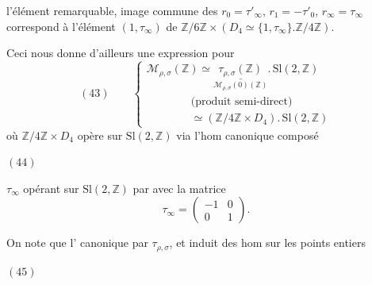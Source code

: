 
l'élément remarquable, image commune des $r_0=\tau'_\infty$, $r_1=-\tau'_0$, $r_\infty=\tau_\infty$ correspond à l'élément $(1,\tau_\infty)$ de $\mathbb Z/6\mathbb Z\times(D_4\simeq\{1,\tau_\infty\}.\mathbb Z/4\mathbb Z)$.

Ceci nous donne d'ailleurs une expression pour 
\[
(43)\qquad
\left\{
\begin{array}{l}
\mathcal M_{\rho,\sigma}(\mathbb Z)\simeq
\underset{\mathcal M_{\rho,\sigma}(0)(\mathbb Z)}{\underline{\tau_{\rho,\sigma}(\mathbb Z)}}
.\,\mathrm{Sl}(2,\mathbb Z)\\[5pt]
\hspace{4em}\text{(produit semi-direct)}\\[5pt]
\hspace{4em}\simeq(\mathbb Z/4\mathbb Z\times D_4).\,\mathrm{Sl}(2,\mathbb Z)
\end{array}\right.
\]
où $\mathbb Z/4\mathbb Z\times D_4$ opère sur $\mathrm{Sl}(2,\mathbb Z)$ via l'hom canonique composé

\noindent$(44)$\quad
{}

$\tau_\infty$ opérant sur $\mathrm{Sl}(2,\mathbb Z)$ par  avec la matrice
\[
\tau_\infty=\begin{pmatrix}-1&0\\0&1\end{pmatrix}.
\]
\margin{!}

On note que l' canonique
 par  $\tau_{\rho,\sigma}$, et induit des hom sur les points entiers

\noindent$(45)$\quad
{}

